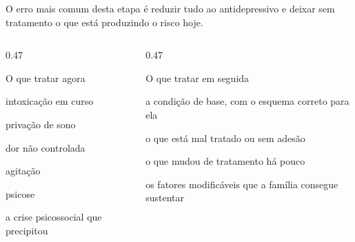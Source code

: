 \begin{frame}{}
{\small O erro mais comum desta etapa \'e reduzir tudo ao antidepressivo e
deixar sem tratamento o que est\'a produzindo o risco hoje.\par}

\CRvg
\begin{columns}[onlytextwidth, t]
\begin{column}{0.47\textwidth}
\begin{caixamudanca}{O que tratar agora}
\begin{itemc}
\item intoxica\c{c}\~ao em curso
\item priva\c{c}\~ao de sono
\item dor n\~ao controlada
\item agita\c{c}\~ao
\item psicose
\item a crise psicossocial que precipitou
\end{itemc}
\end{caixamudanca}
\end{column}
\calha
\begin{column}{0.47\textwidth}
\begin{caixaproteger}{O que tratar em seguida}
\begin{itemc}
\item a condi\c{c}\~ao de base, com o esquema correto para ela
\item o que est\'a mal tratado ou sem ades\~ao
\item o que mudou de tratamento h\'a pouco
\item os fatores modific\'aveis que a fam\'ilia consegue sustentar
\end{itemc}
\end{caixaproteger}
\end{column}
\end{columns}

\end{frame}

